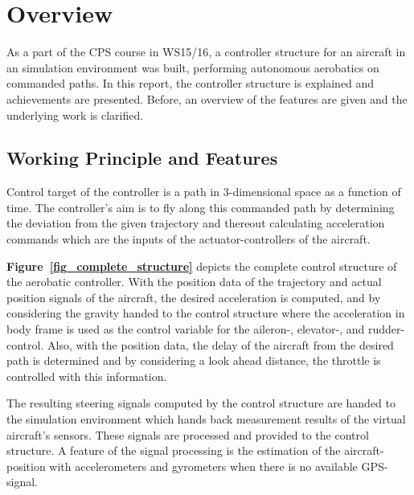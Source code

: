\documentclass[11pt,a4paper]{scrartcl}		%
\begin{document}


\newpage
	

\section{Overview}

As a part of the CPS course in WS15/16, a controller structure for an aircraft in an simulation environment was built, performing autonomous aerobatics on commanded paths.
In this report, the controller structure is explained and achievements are presented.
Before, an overview of the features are given and the underlying work is clarified.

\medskip

\subsection{Working Principle and Features}

Control target of the controller is a path in 3-dimensional space as a function of time.
The controller's aim is to fly along this commanded path by determining the deviation from the given trajectory and thereout calculating acceleration commands which are the inputs of the actuator-controllers of the aircraft.

\textbf{Figure~\ref{fig_complete_structure}} depicts the complete control structure of the aerobatic controller. 
With the position data of the trajectory and actual position signals of the aircraft, the desired acceleration is computed, and by considering the gravity handed to the control structure where the acceleration in body frame is used as the control variable for the aileron-, elevator-, and rudder-control.
Also, with the position data, the delay of the aircraft from the desired path is determined and by considering a look ahead distance, the throttle is controlled with this information.

The resulting steering signals computed by the control structure are handed to the simulation environment which hands back measurement results of the virtual aircraft's sensors.
These signals are processed and provided to the control structure. A feature of the signal processing is the estimation of the aircraft-position with accelerometers and gyrometers when there is no available GPS-signal.
\end{document}
